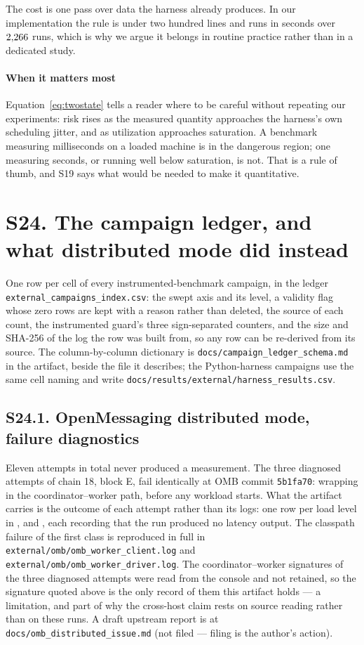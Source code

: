 \documentclass[10pt,journal,onecolumn]{IEEEtran}
\begin{document}
The cost is one pass over data the harness already produces. In our implementation the rule is
under two hundred lines and runs in seconds over $2{,}266$ runs, which is why we argue it
belongs in routine practice rather than in a dedicated study.

\paragraph{When it matters most} Equation~\ref{eq:twostate} tells a reader
where to be careful without repeating our experiments: risk rises as the measured quantity approaches the
harness's own scheduling jitter, and as utilization approaches saturation. A benchmark
measuring milliseconds on a loaded machine is in the dangerous region; one measuring seconds, or
running well below saturation, is not. That is a rule of thumb, and S19 says what would be needed to make it quantitative.

\section{S24. The campaign ledger, and what distributed mode did instead}

One row per cell of every instrumented-benchmark campaign, in the ledger
\texttt{external\_campaigns\_index.csv}: the swept axis and its level, a
validity flag whose zero rows are kept with a reason rather than deleted, the source of
each count, the instrumented guard's three sign-separated counters, and the size and
SHA-256 of the log the row was built from, so any row can be re-derived from its source.
The column-by-column dictionary is \texttt{docs/campaign\_ledger\_schema.md} in the
artifact, beside the file it describes; the Python-harness campaigns use the same cell
naming and write \texttt{docs/results/external/harness\_results.csv}.
\subsection{S24.1. OpenMessaging distributed mode, failure diagnostics}
Eleven attempts in total never produced a measurement. The three diagnosed attempts of
chain 18, block E, fail identically at OMB commit \texttt{5b1fa70}:
 wrapping
 in the coordinator--worker path, before any workload
starts. What the artifact carries is the outcome of each attempt rather than its logs: one row
per load level in ,
 and ,
each recording that the run produced no latency output. The classpath failure of the first
class is reproduced in full in \texttt{external/omb/omb\_worker\_client.log} and
\texttt{external/omb/omb\_worker\_driver.log}. The coordinator--worker signatures of the
three diagnosed attempts were read from the console and not retained, so the signature quoted
above is the only record of them this artifact holds --- a limitation, and part of why the
cross-host claim rests on source reading rather than on these runs. A draft upstream report is
at \texttt{docs/omb\_distributed\_issue.md} (not filed --- filing is the author's action).
\end{document}

